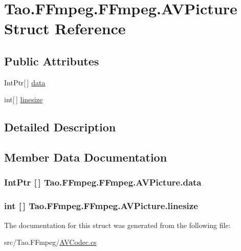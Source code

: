 \hypertarget{struct_tao_1_1_f_fmpeg_1_1_f_fmpeg_1_1_a_v_picture}{
\section{Tao.FFmpeg.FFmpeg.AVPicture Struct Reference}
\label{struct_tao_1_1_f_fmpeg_1_1_f_fmpeg_1_1_a_v_picture}
}
\subsection*{Public Attributes}
\begin{DoxyCompactItemize}
\item 
IntPtr\mbox{[}$\,$\mbox{]} \hyperlink{struct_tao_1_1_f_fmpeg_1_1_f_fmpeg_1_1_a_v_picture_a6ee7faafd28406e773300d7c9341c0b0}{data}
\item 
int\mbox{[}$\,$\mbox{]} \hyperlink{struct_tao_1_1_f_fmpeg_1_1_f_fmpeg_1_1_a_v_picture_a300607c5c849875057a609cc5df0c103}{linesize}
\end{DoxyCompactItemize}


\subsection{Detailed Description}


\subsection{Member Data Documentation}
\hypertarget{struct_tao_1_1_f_fmpeg_1_1_f_fmpeg_1_1_a_v_picture_a6ee7faafd28406e773300d7c9341c0b0}{
\subsubsection[{data}]{\setlength{\rightskip}{0pt plus 5cm}IntPtr \mbox{[}$\,$\mbox{]} {\bf Tao.FFmpeg.FFmpeg.AVPicture.data}}}
\label{struct_tao_1_1_f_fmpeg_1_1_f_fmpeg_1_1_a_v_picture_a6ee7faafd28406e773300d7c9341c0b0}
\hypertarget{struct_tao_1_1_f_fmpeg_1_1_f_fmpeg_1_1_a_v_picture_a300607c5c849875057a609cc5df0c103}{
\subsubsection[{linesize}]{\setlength{\rightskip}{0pt plus 5cm}int \mbox{[}$\,$\mbox{]} {\bf Tao.FFmpeg.FFmpeg.AVPicture.linesize}}}
\label{struct_tao_1_1_f_fmpeg_1_1_f_fmpeg_1_1_a_v_picture_a300607c5c849875057a609cc5df0c103}


The documentation for this struct was generated from the following file:\begin{DoxyCompactItemize}
\item 
src/Tao.FFmpeg/\hyperlink{_a_v_codec_8cs}{AVCodec.cs}\end{DoxyCompactItemize}
